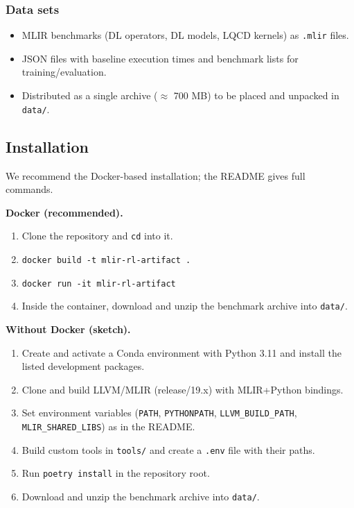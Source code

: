 \documentclass[10pt,twocolumn]{article}
\begin{document}
\subsubsection{Data sets}
\begin{itemize}
\item MLIR benchmarks (DL operators, DL models, LQCD kernels) as \texttt{.mlir} files.
\item JSON files with baseline execution times and benchmark lists for training/evaluation.
\item Distributed as a single archive ($\approx$ 700 MB) to be placed and unpacked in \texttt{data/}.
\end{itemize}

\subsection{Installation}
We recommend the Docker-based installation; the README gives full commands.

\textbf{Docker (recommended).}
\begin{enumerate}
\item Clone the repository and \texttt{cd} into it.
\item \texttt{docker build -t mlir-rl-artifact .}
\item \texttt{docker run -it mlir-rl-artifact}
\item Inside the container, download and unzip the benchmark archive into \texttt{data/}.
\end{enumerate}

\textbf{Without Docker (sketch).}
\begin{enumerate}
\item Create and activate a Conda environment with Python 3.11 and install the listed development packages.
\item Clone and build LLVM/MLIR (release/19.x) with MLIR+Python bindings.
\item Set environment variables (\texttt{PATH}, \texttt{PYTHONPATH}, \texttt{LLVM\_BUILD\_PATH}, \texttt{MLIR\_SHARED\_LIBS}) as in the README.
\item Build custom tools in \texttt{tools/} and create a \texttt{.env} file with their paths.
\item Run \texttt{poetry install} in the repository root.
\item Download and unzip the benchmark archive into \texttt{data/}.
\end{enumerate}
\end{document}
